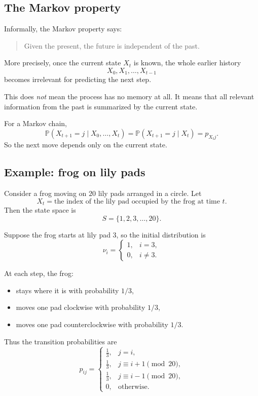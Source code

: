 \documentclass[11pt]{article}
\theoremstyle{definition}
\begin{document}
\subsection{The Markov property}

Informally, the Markov property says:

\begin{quote}
Given the present, the future is independent of the past.
\end{quote}

More precisely, once the current state \(X_t\) is known, the whole earlier history
\[
X_0,X_1,\dots,X_{t-1}
\]
becomes irrelevant for predicting the next step.

This does \emph{not} mean the process has no memory at all. It means that all relevant information from the past is summarized by the current state.

\begin{keyformula}
For a Markov chain,
\[
\mathbb P(X_{t+1}=j\mid X_0,\dots,X_t)
=
\mathbb P(X_{t+1}=j\mid X_t)
=
p_{X_t j}.
\]
So the next move depends only on the current state.
\end{keyformula}

\subsection{Example: frog on lily pads}

Consider a frog moving on \(20\) lily pads arranged in a circle. Let
\[
X_t=\text{the index of the lily pad occupied by the frog at time } t.
\]
Then the state space is
\[
S=\{1,2,3,\dots,20\}.
\]

Suppose the frog starts at lily pad \(3\), so the initial distribution is
\[
\nu_i=
\begin{cases}
1, & i=3,\\
0, & i\ne 3.
\end{cases}
\]

At each step, the frog:
\begin{itemize}[leftmargin=2em]
    \item stays where it is with probability \(1/3\),
    \item moves one pad clockwise with probability \(1/3\),
    \item moves one pad counterclockwise with probability \(1/3\).
\end{itemize}

Thus the transition probabilities are
\[
p_{ij}=
\begin{cases}
\frac13, & j=i,\\[0.4em]
\frac13, & j\equiv i+1 \pmod{20},\\[0.4em]
\frac13, & j\equiv i-1 \pmod{20},\\[0.4em]
0, & \text{otherwise.}
\end{cases}
\]
\end{document}
